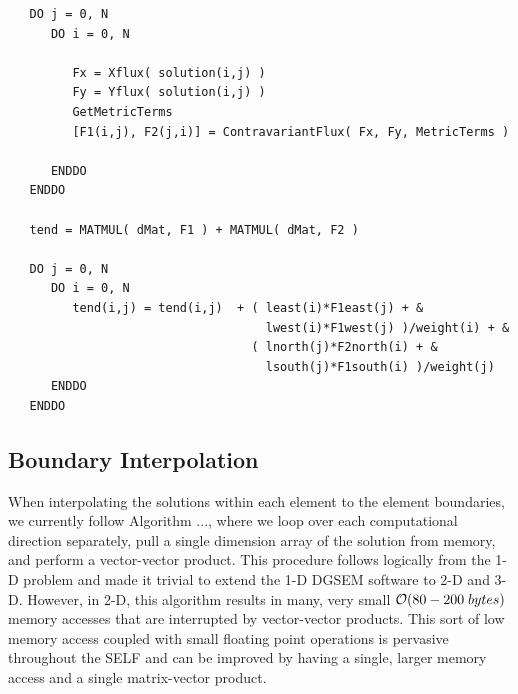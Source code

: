 \documentclass{softwaremanual}
\begin{document}
 \begin{verbatim}
   DO j = 0, N
      DO i = 0, N
         
         Fx = Xflux( solution(i,j) )
         Fy = Yflux( solution(i,j) )
         GetMetricTerms
         [F1(i,j), F2(j,i)] = ContravariantFlux( Fx, Fy, MetricTerms )
        
      ENDDO
   ENDDO
   
   tend = MATMUL( dMat, F1 ) + MATMUL( dMat, F2 )
   
   DO j = 0, N
      DO i = 0, N
         tend(i,j) = tend(i,j)  + ( least(i)*F1east(j) + &
                                    lwest(i)*F1west(j) )/weight(i) + & 
                                  ( lnorth(j)*F2north(i) + &
                                    lsouth(j)*F1south(i) )/weight(j)
      ENDDO
   ENDDO
 \end{verbatim}
 
 \subsection{Boundary Interpolation}
 When interpolating the solutions within each element to the element boundaries, we currently
 follow Algorithm ..., where we loop over each computational direction separately, pull a single dimension array of the solution from memory, and perform a vector-vector product. This procedure follows logically from the 1-D problem and made it trivial to extend the 1-D DGSEM software to 2-D and 3-D. However, in 2-D, this algorithm results in many, very small $\mathcal{O}(80-200 \hspace{1mm} bytes)$ memory accesses that are interrupted by vector-vector products. This sort of low memory access coupled with small floating point operations is pervasive throughout the SELF and can be improved by having a single, larger memory access and a single matrix-vector product. 
 
\end{document}
